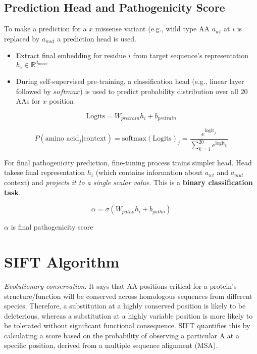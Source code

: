 \documentclass[../main.tex]{subfiles}
\begin{document}
\hrulefill

\subsection*{Prediction Head and Pathogenicity Score}
To make a prediction for a $x$ missense variant  (e.g., wiild type AA $a_{wt}$ at $i$ is replaced by $a_{mut}$ a prediction head is used.
\begin{itemize}
    \item Extract final embedding for residue $i$ from target sequence's representation $h_i \in \mathbb{R}^{d_{model}}$
    \item During self-supervised pre-training, a classification head  (e.g., linear layer followed by $softmax$) is used to predict probability distribution over all $20$ AAs for $x$ position
\end{itemize}

\begin{equation}
    \text{Logits} = W_{pretrain}h_i + b_{pretrain}
\end{equation}


\begin{equation}
    P(\text{amino acid}_j|\text{context}) = \text{softmax}(\text{Logits})_j = \frac{e^{\text{logit}_j}}{\sum_{k=1}^{20} e^{\text{logit}_k}}
\end{equation}

For final pathogenicity prediction, fine-tuning process trains simpler head. Head takese final representation $h_i$ (which contains information about $a_{wt}$ and $a_{mut}$ context) and \textit{projects it to a single scalar value}. This is a \textbf{binary classification task}.

\begin{equation}
    \alpha = \sigma(W_{patho}h_i + b_{patho})
\end{equation}

$\alpha$ is final pathogenicity score

\hrulefill

 \cite{Ng2003SIFT}

\section{SIFT Algorithm}

\textit{Evolutionary conservation}. It says that AA positions critical for a protein's structure/function will be conserved across homologous sequences from different species. Therefore, a substitution at a highly conserved position is likely to be deleterious, whereas a substitution at a highly variable position is more likely to be tolerated without significant functional consequence. SIFT quantifies this by calculating a score based on the probability of observing a particular A at a specific position, derived from a multiple sequence alignment (MSA).
\end{document}
